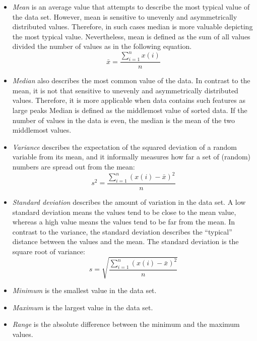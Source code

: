\documentclass[english,12pt,a4paper,pdftex,elec,utf8]{aaltothesis}
\begin{document}
\begin{itemize}
\item \textit{Mean} is an average value that attempts to describe the most typical value of the data set. However, mean is sensitive to unevenly and asymmetrically distributed values. Therefore, in such cases median is more valuable depicting the most typical value. Nevertheless,  mean is defined as the sum of all values divided the number of values as in the following equation.
\begin{equation} \label{meanequation}
\bar{x} = \frac{\displaystyle \sum\limits^{n}_{i = 1} x(i)}{n}
\end{equation} 

\item \textit{Median} also describes the most common value of the data. In contrast to the mean, it is not that sensitive to unevenly and asymmetrically distributed values. Therefore, it is more applicable when data contains such features as large peaks Median is defined as the middlemost value of sorted data. If the number of values in the data is even, the median is the mean of the two middlemost values.

\item \textit{Variance} describes the expectation of the squared deviation of a random variable from its mean, and it informally measures how far a set of (random) numbers are spread out from the mean:
\begin{equation} \label{varianceequation}
s^2 = \frac{ \sum\limits_{i = 1}^{n}(x(i) - \bar{x})^2}{n}
\end{equation} 

\item \textit{Standard deviation} describes the amount of variation in the data set. A low standard deviation means the values tend to be close to the mean value, whereas a high value means the values tend to be far from the mean. In contrast to the variance, the standard deviation describes the ``typical''  distance between the values and the mean. The standard deviation is the square root of variance:
\begin{equation} \label{standarddeviationequation}
s = \sqrt{\frac{ \sum\limits_{i = 1}^{n}(x(i) - \bar{x})^2}{n}}
\end{equation}

\item \textit{Minimum} is the smallest value in the data set.

\item \textit{Maximum} is the largest value in the data set.

\item \textit{Range} is the absolute difference between the minimum and the maximum values.
\end{itemize}
\end{document}
